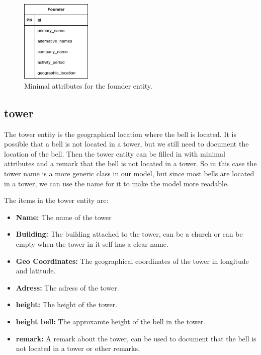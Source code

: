 \documentclass[11pt, a4paper]{article}
\begin{document}
\begin{figure}[h!]
    \centering
    \includegraphics[width=0.3\textwidth]{images/founder.png}
    \caption{Minimal attributes for the founder entity.}
    \label{fig:founder-entity}
\end{figure}

\subsection{tower}

The tower entity is the geographical location where the bell is located. It is possible that a bell is not located in a tower, but we still need to document the location of the bell. Then the tower entity can be filled in with minimal attributes and a remark that the bell is not located in a tower. So in this case the tower name is a more generic class in our model, but since most bells are located in a tower, we can use the name for it to make the model more readable.

The items in the tower entity are:

\begin{itemize}
    \item \textbf{Name:} The name of the tower
    \item \textbf{Building:} The building attached to the tower, can be a church or can be empty when the tower in it self has a clear name.
    \item \textbf{Geo Coordinates:} The geographical coordinates of the tower in longitude and latitude.
    \item \textbf{Adress:} The adress of the tower.
    \item \textbf{height:} The height of the tower.
    \item \textbf{height bell:} The approxamte height of the bell in the tower.
    \item \textbf{remark:} A remark about the tower, can be used to document that the bell is not located in a tower or other remarks.
\end{itemize}
\end{document}

